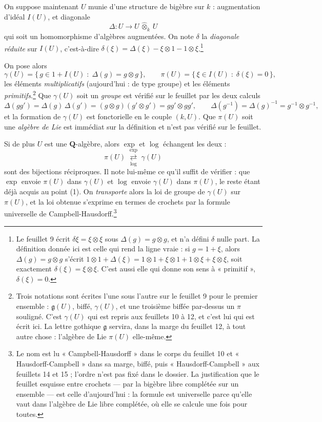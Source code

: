 \documentclass[11pt,a4paper]{article}
\begin{document}
On suppose maintenant $U$ munie d'une structure de bigèbre sur $k$ :
augmentation d'idéal $I(U)$, et diagonale
\[
  \Delta : U \longrightarrow U \,\widehat{\otimes}_{k}\, U
\]
qui soit un homomorphisme d'algèbres augmentées. On note $\delta$ la
\emph{diagonale réduite} sur $I(U)$, c'est-à-dire
$\delta(\xi) = \Delta(\xi) - \xi \otimes 1 - 1 \otimes \xi$.\footnote{Le
feuillet 9 écrit $\delta\xi = \xi \otimes \xi$ sous $\Delta(g) = g \otimes g$,
et n'a défini $\delta$ nulle part. La définition donnée ici est celle qui rend
la ligne vraie : si $g = 1 + \xi$, alors $\Delta(g) = g \otimes g$ s'écrit
$1\otimes 1 + \Delta(\xi) = 1 \otimes 1 + \xi\otimes 1 + 1\otimes\xi +
\xi\otimes\xi$, soit exactement $\delta(\xi) = \xi \otimes \xi$. C'est aussi
elle qui donne son sens à « primitif », $\delta(\xi) = 0$.}

On pose alors
\[
  \gamma(U) = \{\, g \in 1 + I(U) \;:\; \Delta(g) = g \otimes g \,\} ,
  \qquad
  \pi(U) = \{\, \xi \in I(U) \;:\; \delta(\xi) = 0 \,\} ,
\]
les éléments \emph{multiplicatifs} (aujourd'hui : de type groupe) et les
éléments \emph{primitifs}.\footnote{Trois notations sont écrites l'une sous
l'autre sur le feuillet 9 pour le premier ensemble : $\mathfrak{g}(U)$, biffé,
$\gamma(U)$, et une troisième biffée par-dessus un $\pi$ souligné. C'est
$\gamma(U)$ qui est repris aux feuillets 10 à 12, et c'est lui qui est écrit
ici. La lettre gothique $\mathfrak{g}$ servira, dans la marge du feuillet 12, à
tout autre chose : l'algèbre de Lie $\pi(U)$ elle-même.} Que $\gamma(U)$ soit
un \emph{groupe} est vérifié sur le feuillet par les deux calculs
\[
  \Delta(g g') = \Delta(g)\,\Delta(g') = (g \otimes g)(g' \otimes g')
  = g g' \otimes g g' , \qquad
  \Delta(g^{-1}) = \Delta(g)^{-1} = g^{-1} \otimes g^{-1} ,
\]
et la formation de $\gamma(U)$ est fonctorielle en le couple $(k, U)$. Que
$\pi(U)$ soit une \emph{algèbre de Lie} est immédiat sur la définition et n'est
pas vérifié sur le feuillet.

Si de plus $U$ est une $\mathbf{Q}$-algèbre, alors $\exp$ et $\log$ échangent
les deux :
\[
  \pi(U) \;\underset{\log}{\overset{\exp}{\rightleftarrows}}\; \gamma(U)
\]
sont des bijections réciproques. Il note lui-même ce qu'il suffit de vérifier :
que $\exp$ envoie $\pi(U)$ dans $\gamma(U)$ et $\log$ envoie $\gamma(U)$ dans
$\pi(U)$, le reste étant déjà acquis au point (1). On \emph{transporte} alors la
loi de groupe de $\gamma(U)$ sur $\pi(U)$, et la loi obtenue s'exprime en termes
de crochets par la formule universelle de Campbell-Hausdorff.\footnote{Le nom
est lu « Campbell-Hausdorff » dans le corps du feuillet 10 et
« Hausdorff-Campbell » dans sa marge, biffé, puis « Hausdorff-Campbell » aux
feuillets 14 et 15 ; l'ordre n'est pas fixé dans le dossier. La justification
que le feuillet esquisse entre crochets — par la bigèbre libre complétée sur un
ensemble — est celle d'aujourd'hui : la formule est universelle parce qu'elle
vaut dans l'algèbre de Lie libre complétée, où elle se calcule une fois pour
toutes.}
\end{document}
